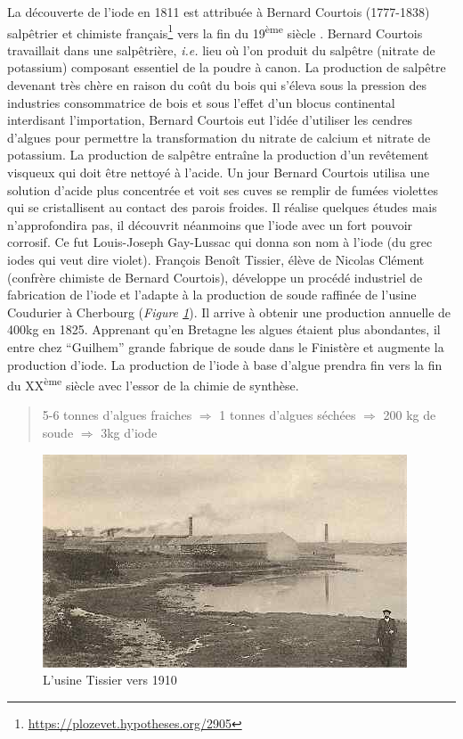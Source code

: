 \documentclass[
]{book}
\begin{document}
La découverte de l'iode en 1811 est attribuée à Bernard Courtois (1777-1838) salpêtrier et chimiste français\footnote{\url{https://plozevet.hypotheses.org/2905}} vers la fin du 19\textsuperscript{ème} siècle \citep{guitard1922}. Bernard Courtois travaillait dans une salpêtrière, \emph{i.e.} lieu où l'on produit du salpêtre (nitrate de potassium) composant essentiel de la poudre à canon. La production de salpêtre devenant très chère en raison du coût du bois qui s'éleva sous la pression des industries consommatrice de bois et sous l'effet d'un blocus continental interdisant l'importation, Bernard Courtois eut l'idée d'utiliser les cendres d'algues pour permettre la transformation du nitrate de calcium et nitrate de potassium.
La production de salpêtre entraîne la production d'un revêtement visqueux qui doit être nettoyé à l'acide. Un jour Bernard Courtois utilisa une solution d'acide plus concentrée et voit ses cuves se remplir de fumées violettes qui se cristallisent au contact des parois froides. Il réalise quelques études mais n'approfondira pas, il découvrit néanmoins que l'iode avec un fort pouvoir corrosif. Ce fut Louis-Joseph Gay-Lussac qui donna son nom à l'iode (du grec iodes qui veut dire violet).
François Benoît Tissier, élève de Nicolas Clément (confrère chimiste de Bernard Courtois), développe un procédé industriel de fabrication de l'iode et l'adapte à la production de soude raffinée de l'usine Coudurier à Cherbourg (\emph{Figure \ref{fig:tissier}}). Il arrive à obtenir une production annuelle de 400kg en 1825. Apprenant qu'en Bretagne les algues étaient plus abondantes, il entre chez ``Guilhem'' grande fabrique de soude dans le Finistère et augmente la production d'iode.
La production de l'iode à base d'algue prendra fin vers la fin du XX\textsuperscript{ème} siècle avec l'essor de la chimie de synthèse.

\begin{quote}
5-6 tonnes d'algues fraiches \(\Rightarrow\) 1 tonnes d'algues séchées \(\Rightarrow\) 200 kg de soude \(\Rightarrow\) 3kg d'iode
\end{quote}

\begin{figure}

{\centering \includegraphics{images/tissier} 

}

\caption{L'usine Tissier vers 1910}\label{fig:tissier}
\end{figure}
\end{document}
